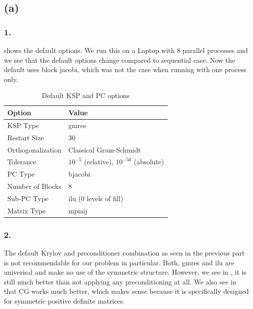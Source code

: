 \subsection*{(a)}
\subsubsection*{1.}
\FloatBarrier
{} shows the default options. We run this on a Laptop with 8 parallel processes and we see that the default options change compared to sequential case. Now the default uses block jacobi, which was not the case when running with one process only.
\begin{table}[h!]
\centering
\begin{tabular}{ll}
\hline
\textbf{Option} & \textbf{Value} \\
\hline
KSP Type & gmres \\
Restart Size & 30 \\
Orthogonalization & Classical Gram-Schmidt \\
Tolerance & $10^{-5}$ (relative), $10^{-50}$ (absolute) \\
PC Type & bjacobi \\
Number of Blocks & 8 \\
Sub-PC Type & ilu (0 levels of fill) \\
Matrix Type & mpiaij \\
\hline
\end{tabular}
\caption{Default KSP and PC options}
\label{defaults_parallel}
\end{table}




\FloatBarrier


\subsubsection*{2.}
\FloatBarrier
The default Krylov and preconditioner combination as seen in the previous part is not recommendable for our problem in particular. Both, gmres and ilu are univerisal and make no use of the symmetric structure. However, we see in , it is still much better than not applying any preconditioning at all. We also see in  that CG works much better, which makes sense because it is specifically designed for symmetric positive definite matrices.







\FloatBarrier


